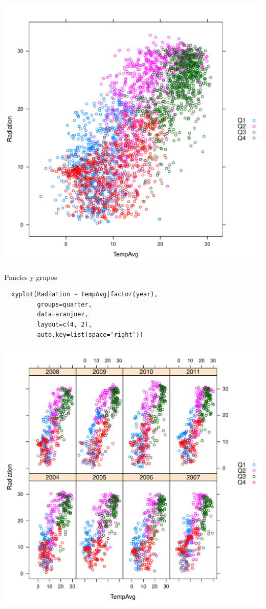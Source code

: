 \documentclass[xcolor={usenames,svgnames,dvipsnames}]{beamer}
\begin{document}
\begin{frame}[label=sec-2-1-13]{}
\includegraphics[width=.9\linewidth]{figs/xyplotQuarter.pdf}
\end{frame}

\begin{frame}[fragile,label=sec-2-1-14]{Paneles y grupos}
 \lstset{language=R,label= ,caption= ,numbers=none}
\begin{lstlisting}
  xyplot(Radiation ~ TempAvg|factor(year),
         groups=quarter,
         data=aranjuez,
         layout=c(4, 2),
         auto.key=list(space='right'))
\end{lstlisting}
\end{frame}

\begin{frame}[label=sec-2-1-15]{}
\includegraphics[width=.9\linewidth]{figs/xyplotQuarterYear.pdf}
\end{frame}
\end{document}
